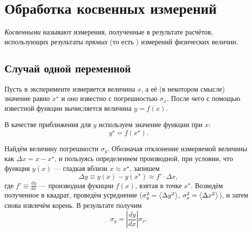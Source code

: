 \section{Обработка косвенных измерений\label{sec:kosv}}

\emph{Косвенными} называют измерения, полученные в результате расчётов,
использующих результаты \emph{прямых} (то есть )
измерений физических величин. 

\subsection{Случай одной переменной}

Пусть в эксперименте измеряется величина $x$, а её 
(в некотором смысле) значение равно $x^{\star}$ и оно известно с
погрешностью $\sigma_{x}$. После чего с помощью известной функции
вычисляется величина $y=f\!\left(x\right)$.

В качестве  приближения для $y$ используем значение функции
при  $x$:
\[
y^{\star}=f\!\left(x^{\star}\right).
\]

Найдём величину погрешности $\sigma_{y}$. Обозначая отклонение измеряемой
величины как $\Delta x=x-x^{\star}$, и пользуясь определением производной,
при условии, что функция $y\left(x\right)$ --- гладкая
вблизи $x\approx x^{\star}$, запишем
\[
\Delta y\equiv y\left(x\right)-y\left(x^{\star}\right)\approx f'\cdot\Delta x,
\]
где $f'\equiv\frac{dy}{dx}$ --- производная фукнции $f(x)$, взятая в точке
$x^{\star}$. Возведём полученное в квадрат, проведём усреднение
($\sigma_{y}^{2}=\left<\Delta y^{2}\right>$,
$\sigma_{x}^{2}=\left<\Delta x^{2}\right>$), и затем снова извлечём
корень. В результате получим
\begin{equation}
{\sigma_{y}=\left|\frac{dy}{dx}\right|\sigma_{x}.}\label{eq:sxy}
\end{equation}



